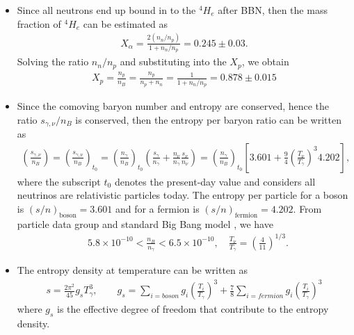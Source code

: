 \documentclass[universe,article,submit,moreauthors,pdftex,a4paper]{Definitions/mdpi}
\begin{document}
\begin{itemize}
  \item Since all neutrons end up bound in to the $^4H_e$ after BBN, then the mass fraction of $^4H_e$ can be estimated as \cite{ParticleDataGroup:2022pth}
\begin{align}
X_\alpha=\frac{2(n_n/n_p)}{1+n_n/n_p}=0.245\pm0.03.
\end{align} 
 Solving the ratio $n_n/n_p$ and substituting into the $X_p$, we obtain
\begin{align}
 X_p=\frac{n_p}{n_B}=\frac{n_p}{n_p+n_n}=\frac{1}{1+n_n/n_p}=0.878\pm0.015
\end{align}

  \item Since the comoving baryon number and entropy are conserved, hence the ratio $s_{\gamma,\nu}/n_B$ is conserved, then the entropy per baryon ratio can be written as
\begin{align}
\left(\frac{s_{\gamma,\nu}}{n_B}\right)=\left(\frac{s_{\gamma,\nu}}{n_B}\right)_{\!\!t_0}\!\!=\left(\frac{n_\gamma}{n_B}\right)_{\!\!t_0}\left(\frac{s_\gamma}{n_\gamma}+\frac{n_\nu}{n_\gamma}\frac{s_\nu}{n_\nu}\right)=\left(\frac{n_\gamma}{n_B}\right)_{\!\!t_0}\left[3.601+\frac{9}{4}\left(\frac{T_\nu}{T_\gamma}\right)^{\!\!3}4.202\right],
\end{align}
where the subscript $t_0$ denotes the present-day value and considers all neutrinos are relativistic particles today. The entropy per particle for a boson is $(s/n)_\mathrm{boson}=3.601$ and for a fermion is $(s/n)_\mathrm{fermion}=4.202$. From particle data group and standard Big Bang model \cite{ParticleDataGroup:2022pth,kolb1981early}, we have
\begin{align}
&5.8\times10^{-10}<\frac{n_B}{n_\gamma}<6.5\times10^{-10},\quad\frac{T_\nu}{T_\gamma}=\left(\frac{4}{11}\right)^{1/3}.
\end{align}

  \item The entropy density at temperature can be written as \cite{kolb1981early}
\begin{align}
s=\frac{2\pi^2}{45}g_sT_\gamma^3,\qquad g_s=\sum_{i=boson}g_i\left(\frac{T_i}{T_\gamma}\right)^3+\frac{7}{8}\sum_{i=fermion}g_i\left(\frac{T_i}{T_\gamma}\right)^3
\end{align}
where $g_s$ is the effective degree of freedom that contribute to the entropy density.  
\end{itemize}
 
\end{document}
